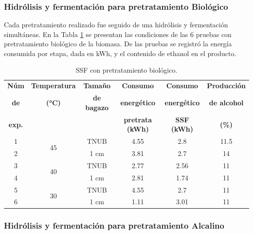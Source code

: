 \documentclass[12pt]{article}
\begin{document}
   	\subsubsection{ Hidrólisis y fermentación para pretratamiento Biológico}
   
Cada pretratamiento realizado fue seguido de una hidrólisis y fermentación simultáneas. En la Tabla \ref{ssf Pretratamiento Biológico} se presentan las condiciones de las 6 pruebas con pretratamiento biológico de la biomasa. De las pruebas se registró la energía consumida por etapa, dada en kWh, y el contenido de ethanol en el producto.

 	\begin{table}[H]
 		\centering
 		\caption{SSF con pretratamiento biológico.}
 		\begin{tabular}{|c|c|c|c|c|c|}
 			\hline
 			\textbf{Núm }& \textbf{Temperatura}  & \textbf{Tamaño} & \textbf{Consumo } & \textbf{Consumo }  & \textbf{Producción} \\ 
 			\textbf{de}&\textbf{(°C)} &\textbf{de bagazo} & \textbf{energético} & \textbf{energético }&\textbf{de alcohol}\\ 
 				\textbf{exp.}&& & \textbf{ pretrata (kWh)} & \textbf{ SSF (kWh)}&\textbf{(\%)}\\ \hline
 			
 			1 & \multirow{2}{*}{45} & TNUB & 4.55 & 2.8  & 11.5 \\ \cline{1-1} \cline{3-6}
 			2 &                     & 1 cm & 3.81 & 2.7  & 14 \\ \hline
 			3 & \multirow{2}{*}{40} & TNUB & 2.77 & 2.56 & 11 \\ \cline{1-1} \cline{3-6}
 			4 &                     & 1 cm & 2.81 & 1.74  & 11 \\  \hline
 			5 & \multirow{2}{*}{30} & TNUB & 4.55 &2.7  & 11 \\ \cline{1-1} \cline{3-6}
 			6 &                     & 1 cm & 1.11 &3.01 & 11 \\ \hline
 		\end{tabular}
 		\label{ssf Pretratamiento Biológico}
 	\end{table}
 	
 
 	
 	
 

 	
		\subsubsection{ Hidrólisis y fermentación para pretratamiento Alcalino}
		
\end{document}
